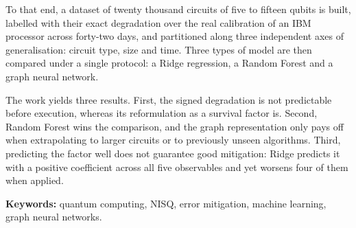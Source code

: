 \documentclass[11pt,a4paper,spanish]{book}
\begin{document}
To that end, a dataset of twenty thousand circuits of five to fifteen qubits is built,
labelled with their exact degradation over the real calibration of an IBM processor across
forty-two days, and partitioned along three independent axes of generalisation: circuit type,
size and time. Three types of model are then compared under a single protocol: a Ridge
regression, a Random Forest and a graph neural network.

The work yields three results. First, the signed degradation is not predictable before
execution, whereas its reformulation as a survival factor is. Second, Random Forest wins the comparison, and the graph representation
only pays off when extrapolating to larger circuits or to previously unseen algorithms. Third,
predicting the factor well does not guarantee good mitigation: Ridge predicts it with a
positive coefficient across all five observables and yet worsens four of them when applied.

\textbf{Keywords:} quantum computing, NISQ, error mitigation, machine learning, graph neural
networks.

\tableofcontents
\listoffigures
\listoftables

\mainmatter





% 


\end{document}
